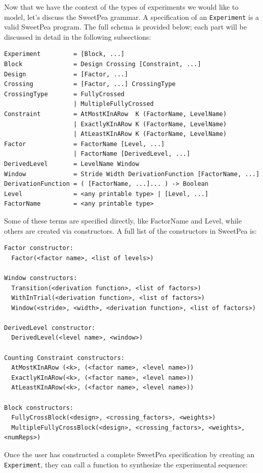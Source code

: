 Now that we have the context of the types of experiments we would like to model, let's discuss the SweetPea grammar. A specification of an \texttt{Experiment} is a valid SweetPea program. The full schema is provided below; each part will be discussed in detail in the following subsections:

\begin{verbatim}
Experiment         = [Block, ...]
Block              = Design Crossing [Constraint, ...]
Design             = [Factor, ...]
Crossing           = [Factor, ...] CrossingType
CrossingType       = FullyCrossed
                   | MultipleFullyCrossed
Constraint         = AtMostKInARow  K (FactorName, LevelName)
                   | ExactlyKInARow K (FactorName, LevelName)
                   | AtLeastKInARow K (FactorName, LevelName)
Factor             = FactorName [Level, ...]
                   | FactorName [DerivedLevel, ...]
DerivedLevel       = LevelName Window
Window             = Stride Width DerivationFunction [FactorName, ...]
DerivationFunction = ( [FactorName, ...]... ) -> Boolean
Level              = <any printable type> | [Level, ...]
FactorName         = <any printable type>
\end{verbatim}

Some of these terms are specified directly, like FactorName and Level, while others are created via constructors. A full list of the constructors in SweetPea is:

\begin{verbatim}
Factor constructor:
  Factor(<factor name>, <list of levels>)

Window constructors:
  Transition(<derivation function>, <list of factors>)
  WithInTrial(<derivation function>, <list of factors>)
  Window(<stride>, <width>, <derivation function>, <list of factors>)

DerivedLevel constructor:
  DerivedLevel(<level name>, <window>)

Counting Constraint constructors:
  AtMostKInARow (<k>, (<factor name>, <level name>))
  ExactlyKInARow(<k>, (<factor name>, <level name>))
  AtLeastKInARow(<k>, (<factor name>, <level name>))

Block constructors:
  FullyCrossBlock(<design>, <crossing_factors>, <weights>)
  MultipleFullyCrossBlock(<design>, <crossing_factors>, <weights>, <numReps>)
\end{verbatim}

Once the user has constructed a complete SweetPea specification by creating an \texttt{Experiment}, they can call a function to synthesize the experimental sequence:

